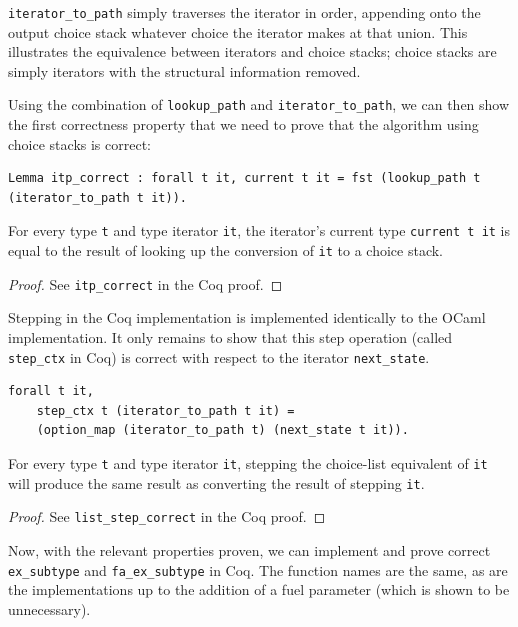 \documentclass[a4paper,english]{lipics-v2019}
\begin{document}
\verb|iterator_to_path| simply traverses the iterator in order, appending onto the
output choice stack whatever choice the iterator makes at that union. This illustrates
the equivalence between iterators and choice stacks; choice stacks are simply iterators
with the structural information removed.

Using the combination of \verb|lookup_path| and \verb|iterator_to_path|, we
can then show the first correctness property that we need to prove that the
algorithm using choice stacks is correct:

\begin{lemma}
\begin{small}\begin{verbatim}
Lemma itp_correct : forall t it, current t it = fst (lookup_path t (iterator_to_path t it)).
\end{verbatim}\end{small}

For every type \verb|t| and type iterator \verb|it|, the iterator's current type \verb|current t it| is equal
to the result of looking up the conversion of \verb|it| to a choice stack.
\end{lemma}
\begin{proof}
See \verb|itp_correct| in the Coq proof.
\end{proof}

Stepping in the Coq implementation is implemented identically to the OCaml
implementation. It only remains to show that this step operation (called
\verb|step_ctx| in Coq) is correct with respect to the iterator
\verb|next_state|.

\begin{lemma}
\begin{small}\begin{verbatim}
forall t it,
    step_ctx t (iterator_to_path t it) =
    (option_map (iterator_to_path t) (next_state t it)).
\end{verbatim}\end{small}
For every type \verb|t| and type iterator \verb|it|,
stepping the choice-list equivalent of \verb|it| will
produce the same result as converting the result of stepping
\verb|it|.
\end{lemma}
\begin{proof}
See \verb|list_step_correct| in the Coq proof.
\end{proof}

Now, with the relevant properties proven, we can implement and prove correct
\verb|ex_subtype| and \verb|fa_ex_subtype| in Coq. The function names are the
same, as are the implementations up to the addition of a fuel parameter (which
is shown to be unnecessary). 
\end{document}
